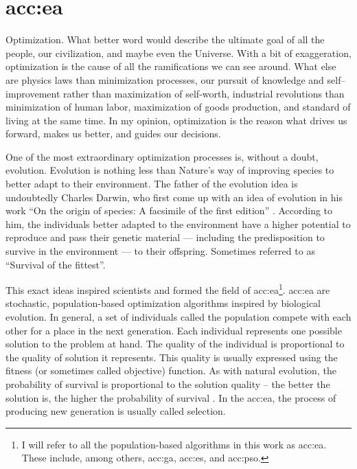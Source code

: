 \chapter{\texorpdfstring{\acrlong*{acc:ea}}{Evolutionary algorithms}}
\label{chap:eva}

Optimization. What better word would describe the ultimate goal of all the people, our civilization, and maybe even the Universe. With a bit of exaggeration, optimization is the cause of all the ramifications we can see around. What else are physics laws than minimization processes, our pursuit of knowledge and self--improvement rather than maximization of self-worth, industrial revolutions than minimization of human labor, maximization of goods production, and standard of living at the same time. In my opinion, optimization is the reason what drives us forward, makes us better, and guides our decisions.

One of the most extraordinary optimization processes is, without a doubt, evolution. Evolution is nothing less than Nature's way of improving species to better adapt to their environment. The father of the evolution idea is undoubtedly Charles Darwin, who first come up with an idea of evolution in his work \enquote{On the origin of species: A facsimile of the first edition} \citep{darwinOriginal}. According to him, the individuals better adapted to the environment have a higher potential to reproduce and pass their genetic material --- including the predisposition to survive in the environment --- to their offspring. Sometimes referred to as \enquote{Survival of the fittest}.

This exact ideas inspired scientists and formed the field of \acrfull{acc:ea}\footnote{I will refer to all the population-based algorithms in this work as \acrlong*{acc:ea}. These include, among others, \acrlong*{acc:ga}, \acrlong*{acc:es}, and \acrlong*{acc:pso}.}.
\acrshort{acc:ea} are stochastic, population-based optimization algorithms inspired by biological evolution. In general, a set of individuals called the population compete with each other for a place in the next generation. Each individual represents one possible solution to the problem at hand. The quality of the individual is proportional to the quality of solution it represents. This quality is usually expressed using the fitness (or sometimes called objective) function. As with natural evolution, the probability of survival is proportional to the solution quality -- the better the solution is, the higher the probability of survival \citep{IntroductionToEA}. In the \acrshort{acc:ea}, the process of producing new generation is usually called selection.

